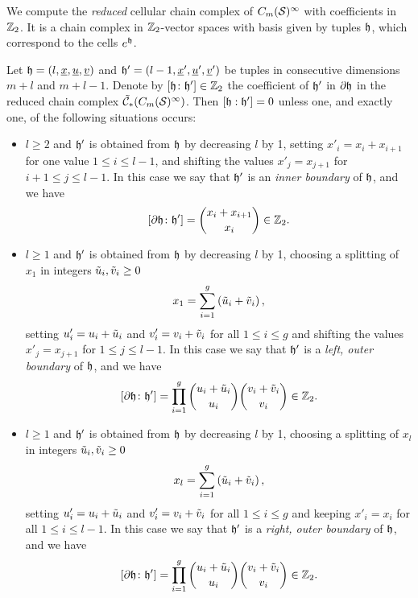 We compute the \emph{reduced} cellular chain complex of $C_m(\mathcal{S})^{\infty}$
with coefficients in $\mathbb{Z}_2$. It is a chain complex in $\mathbb{Z}_2$-vector spaces with basis given
by tuples $\mathfrak{h}$, which correspond to the cells $e^{\mathfrak{h}}$.
\begin{lem}
\label{lem:doperatoropenmodtwo}
Let $\mathfrak{h}=(l,\underline{x},\underline{u}, \underline{v})$ and
$\mathfrak{h}'=(l-1,\underline{x}',\underline{u}',\underline{v}')$
be tuples in consecutive dimensions $m+l$ and $m+l-1$. Denote by $[\mathfrak{h}\colon\mathfrak{h}']\in\mathbb{Z}_2$ the coefficient
of $\mathfrak{h}'$ in $\partial \mathfrak{h}$ in the reduced chain complex $\tilde{\mathcal{C}}_*(C_m(\mathcal{S})^{\infty})$.
Then $[\mathfrak{h}:\mathfrak{h}']=0$ unless one, and exactly one, of the following situations occurs:
\begin{itemize}
 \item $l\geq 2$ and $\mathfrak{h}'$ is obtained from $\mathfrak{h}$ by decreasing $l$ by 1, setting $x'_i=x_i+x_{i+1}$
 for one value $1\leq i\leq l-1$, and shifting the values
 $x'_j=x_{j+1}$ for $i+1\leq j\leq l-1$. In this case we say that $\mathfrak{h}'$ is an \emph{inner boundary} of $\mathfrak{h}$, and
 we have
 \[
  [\partial \mathfrak{h}\colon\mathfrak{h}']=\binom{x_i+x_{i+1}}{x_i}\in\mathbb{Z}_2.
 \]
 \item $l\geq 1$ and $\mathfrak{h}'$ is obtained from $\mathfrak{h}$ by decreasing $l$ by 1, choosing a splitting of $x_1$
 in integers $\tilde u_i,\tilde v_i\geq 0$
 \[
  x_1=\sum_{i=1}^g \left(\tilde u_i+\tilde v_i\right),
 \]
 setting $u'_i=u_i+\tilde u_i$ and $v'_i=v_i+\tilde v_i$ for all $1\leq i\leq g$ and shifting the values
 $x'_j=x_{j+1}$ for $1\leq j\leq l-1$. In this case we say that $\mathfrak{h}'$ is a \emph{left, outer boundary} of $\mathfrak{h}$, and we have
 \[
  [\partial \mathfrak{h}\colon\mathfrak{h}']=\prod_{i=1}^g\binom{u_i+\tilde u_i}{u_i}\binom{v_i+\tilde v_i}{v_i}\in\mathbb{Z}_2.
 \]
 \item $l\geq 1$ and $\mathfrak{h}'$ is obtained from $\mathfrak{h}$ by decreasing $l$ by 1, choosing a splitting of $x_l$
 in integers $\tilde u_i,\tilde v_i\geq 0$
 \[
  x_l=\sum_{i=1}^g \left(\tilde u_i+\tilde v_i\right),
 \]
 setting $u'_i=u_i+\tilde u_i$ and $v'_i=v_i+\tilde v_i$ for all $1\leq i\leq g$ and keeping $x'_i=x_i$ for all $1\leq i\leq l-1$.
 In this case we say that $\mathfrak{h}'$ is a \emph{right, outer boundary} of $\mathfrak{h}$, and we have
 \[
  [\partial \mathfrak{h}\colon\mathfrak{h}']=\prod_{i=1}^g\binom{u_i+\tilde u_i}{u_i}\binom{v_i+\tilde v_i}{v_i}\in\mathbb{Z}_2.
 \]
\end{itemize}

\end{lem}
